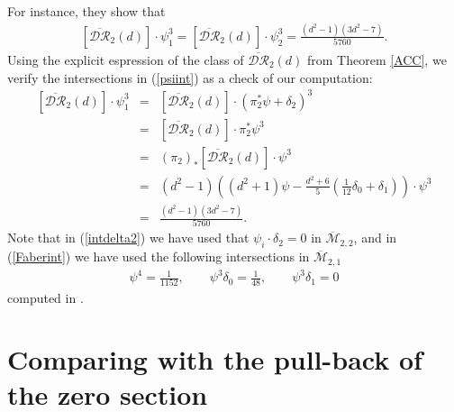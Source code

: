 \documentclass[10pt]{amsart}
\theoremstyle{definition}
\begin{document}
For instance, they show that
\begin{eqnarray}
 \label{psiint}
 \left[\overline{\mathcal{DR}}_2(d) \right]\cdot \psi_1^3 = \left[\overline{\mathcal{DR}}_2(d) \right]\cdot \psi_2^3 = \frac{(d^2-1)(3d^2-7)}{5760}. 
\end{eqnarray}
Using the explicit espression of the class of $\overline{\mathcal{DR}}_2(d)$ from Theorem \ref{ACC}, we verify the intersections in (\ref{psiint}) as a 
check of our computation:
\begin{eqnarray}
 \left[\overline{\mathcal{DR}}_2(d) \right]\cdot \psi_1^3 &=& \left[\overline{\mathcal{DR}}_2(d) \right]\cdot (\pi_2^*\psi +\delta_2)^3 \nonumber\\
	&=& \left[\overline{\mathcal{DR}}_2(d) \right]\cdot \pi_2^*\psi^3 \label{intdelta2}\\
	&=& (\pi_2)_*\left[\overline{\mathcal{DR}}_2(d) \right]\cdot \psi^3 \nonumber\\
	&=& (d^2-1)\left((d^2+1)\psi-\frac{d^2+6}{5}\left(\frac{1}{12}\delta_0+\delta_1\right) \right)\cdot\psi^3 \nonumber\\
	&=& \frac{(d^2-1)(3d^2-7)}{5760}. \label{Faberint}
\end{eqnarray}
Note that in (\ref{intdelta2}) we have used that $\psi_i\cdot\delta_2=0$ in ${\overline{\mathcal{M}}}_{2,2}$, and in (\ref{Faberint}) we have used the following intersections in ${\overline{\mathcal{M}}}_{2,1}$
\begin{eqnarray*}
 \psi^4 = \frac{1}{1152},\quad\quad \psi^3\delta_0 = \frac{1}{48},\quad\quad \psi^3\delta_1 = 0
\end{eqnarray*}
computed in \cite[Chapter 3]{faberthesis}.

\section{Comparing with the pull-back of the zero section}
\label{Hain}
\end{document}
